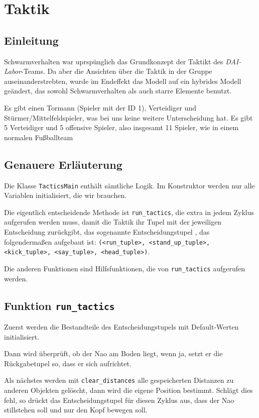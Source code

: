 \section*{Taktik}

\subsection*{Einleitung}

Schwarmverhalten war uprspünglich das Grundkonzept der Taktikt des \textit{DAI-Labor}-Teams. Da aber die Ansichten über die Taktik in der Gruppe auseinanderstrebten, wurde im Endeffekt das Modell auf ein hybrides Modell geändert, das sowohl Schwarmverhalten als auch starre Elemente benutzt. 

Es gibt einen Tormann (Spieler mit der ID 1), Verteidiger und Stürmer/Mittelfeldspieler, was bei uns keine weitere Unterscheidung hat. Es gibt 5 Verteidiger und 5 offensive Spieler, also insgesamt 11 Spieler, wie in einem normalen Fußballteam

\subsection*{Genauere Erläuterung}

Die Klasse \texttt{TacticsMain} enthält sämtliche Logik. Im Konstruktor werden nur alle Variablen initialisiert, die wir brauchen.

Die eigentlich entscheidende Methode ist \texttt{run\_tactics}, die extra in jedem Zyklus aufgerufen werden muss, damit die Taktik ihr Tupel mit der jeweiligen Entscheidung zurückgibt, das sogenannte \glqq Entscheidungstupel \grqq, das folgendermaßen aufgebaut ist: \texttt{(<run\_tuple>, <stand\_up\_tuple>, <kick\_tuple>, <say\_tuple>, <head\_tuple>)}. 

Die anderen Funktionen sind Hilfsfunktionen, die von \texttt{run\_tactics} aufgerufen werden. 

\subsection*{Funktion \texttt{run\_tactics}}
Zuerst werden die Bestandteile des \glqq Entscheidungstupels \grqq mit Default-Werten initialisiert. 

Dann wird überprüft, ob der Nao am Boden liegt, wenn ja, setzt er die Rückgabetupel so, dass er sich aufrichtet.

Als nächstes werden mit \texttt{clear\_distances} alle gespeicherten Distanzen zu anderen Objekten gelöscht, dann wird die eigene Position bestimmt. Schlägt dies fehl, so drückt das \glqq Entscheidungstupel \grqq für diesen Zyklus aus, dass der Nao stillstehen soll und nur den Kopf bewegen soll.

